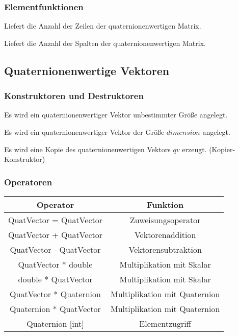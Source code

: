 	\subsubsection{Elementfunktionen}
		\descr
		{
			Liefert die Anzahl der Zeilen der quaternionenwertigen Matrix.
		}
		
		\descr
		{
			Liefert die Anzahl der Spalten der quaternionenwertigen Matrix.
		}
\subsection{Quaternionenwertige Vektoren}
 \subsubsection{Konstruktoren und Destruktoren}
		\descr
		{
			Es wird ein quaternionenwertiger Vektor unbestimmter Größe angelegt.
		}
	
		\descr
		{
			Es wird ein quaternionenwertiger Vektor der Größe $dimension$ angelegt.
		}
	
		\descr
		{
			Es wird eine Kopie des quaternionenwertigen Vektors $qv$ erzeugt.
			(Kopier-Konstruktor)
		}
	
	\subsubsection{Operatoren}
		\begin{tabular}{|c|c|}
			\hline
			Operator & Funktion\\ 
			\hline
			QuatVector = QuatVector & Zuweisungsoperator\\
			\hline
			QuatVector + QuatVector & Vektorenaddition\\
			\hline
			QuatVector - QuatVector & Vektorensubtraktion\\
			\hline
			QuatVector * double & Multiplikation mit Skalar\\
			\hline
			double * QuatVector & Multiplikation mit Skalar\\
			\hline
			QuatVector * Quaternion & Multiplikation mit Quaternion\\
			\hline
			Quaternion * QuatVector & Multiplikation mit Quaternion\\
			\hline
			Quaternion [int] & Elementzugriff
		\end{tabular}
		
